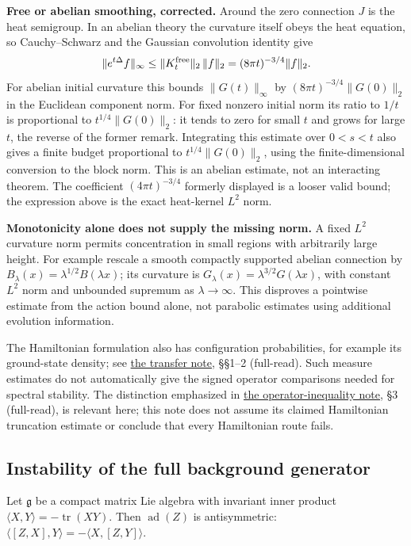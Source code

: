 \documentclass[11pt,a4paper]{article}
\begin{document}
\textbf{Free or abelian smoothing, corrected.} Around the zero
connection \(J\) is the heat semigroup. In an abelian theory the
curvature itself obeys the heat equation, so Cauchy--Schwarz and the
Gaussian convolution identity give \[\|e^{t\Delta}f\|_\infty
\le\|K_t^{\rm free}\|_2\,\|f\|_2
=(8\pi t)^{-3/4}\|f\|_2.\] For abelian initial curvature this bounds
\(\|G(t)\|_\infty\) by \((8\pi t)^{-3/4}\|G(0)\|_2\) in the Euclidean
component norm. For fixed nonzero initial norm its ratio to \(1/t\) is
proportional to \(t^{1/4}\|G(0)\|_2\): it tends to zero for small \(t\)
and grows for large \(t\), the reverse of the former remark. Integrating
this estimate over \(0<s<t\) also gives a finite budget proportional to
\(t^{1/4}\|G(0)\|_2\), using the finite-dimensional conversion to the
block norm. This is an abelian estimate, not an interacting theorem. The
coefficient \((4\pi t)^{-3/4}\) formerly displayed is a looser valid
bound; the expression above is the exact heat-kernel \(L^2\) norm.

\textbf{Monotonicity alone does not supply the missing norm.} A fixed
\(L^2\) curvature norm permits concentration in small regions with
arbitrarily large height. For example rescale a smooth compactly
supported abelian connection by
\(B_\lambda(x)=\lambda^{1/2}B(\lambda x)\); its curvature is
\(G_\lambda(x)=\lambda^{3/2}G(\lambda x)\), with constant \(L^2\) norm
and unbounded supremum as \(\lambda\to\infty\). This disproves a
pointwise estimate from the action bound alone, not parabolic estimates
using additional evolution information.

The Hamiltonian formulation also has configuration probabilities, for
example its ground-state density; see
\href{ground-state-measure-transfer.md}{the transfer note}, §§1--2
(full-read). Such measure estimates do not automatically give the signed
operator comparisons needed for spectral stability. The distinction
emphasized in \href{large-field-operator-inequality.md}{the
operator-inequality note}, §3 (full-read), is relevant here; this note
does not assume its claimed Hamiltonian truncation estimate or conclude
that every Hamiltonian route fails.

\hypertarget{instability-of-the-full-background-generator}{%
\subsection{Instability of the full background
generator}\label{instability-of-the-full-background-generator}}

Let \(\mathfrak g\) be a compact matrix Lie algebra with invariant inner
product \(\langle X,Y\rangle=-\operatorname{tr}(XY)\). Then
\(\operatorname{ad}(Z)\) is antisymmetric:
\(\langle[Z,X],Y\rangle=-\langle X,[Z,Y]\rangle\).
\end{document}
